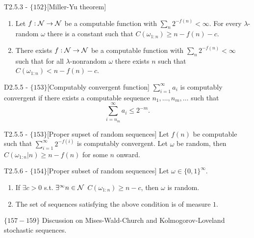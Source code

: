 \documentclass{article}
\begin{document}
\begin{flexitheorem}{T2.5.3 - $\{152\}$}[Miller-Yu theorem]
    \begin{enumerate}[label = (\roman*)]
        \item Let $f : \mathcal{N} \to \mathcal{N}$ be a computable function with $\sum_n 2^{-f(n)} < \infty$. For every $\lambda$-random $\omega$ there is a constant such that $C(\omega_{1:n}) \geq n -f(n) - c$.
        \item There exists $f : \mathcal{N} \to \mathcal{N}$ be a computable function with $\sum_n 2^{-f(n)} < \infty$ such that for all $\lambda$-nonrandom $\omega$ there exists $n$ such that $C(\omega_{1:n}) < n -f(n) - c$.
    \end{enumerate}
\end{flexitheorem}

\begin{flexidefinition}{D2.5.5 - $\{153\}$}[Computably convergent function]
    $\sum_{i=1}^\infty a_i$ is computably convergent if there exists a computable sequence $n_1, \ldots, n_m, \ldots$ such that 
    \begin{equation}
        \sum_{i=n_m}^\infty a_i \leq 2^{-m}.
    \end{equation}
    
\end{flexidefinition}
    
\begin{flexitheorem}{T2.5.5 - $\{153\}$}[Proper supset of random sequences]
    Let $f(n)$ be computable such that $\sum_{i=1}^\infty 2^{-f(i)}$ is computably convergent. Let $\omega$ be random, then $C(\omega_{1:n}|n) \geq n - f(n)$ for some $n$ onward.
    
   
\end{flexitheorem}

\begin{flexitheorem}{T2.5.6 - $\{154\}$}[Proper subset of random sequences]
    Let $\omega \in \{0,1\}^\infty$.
    \begin{enumerate}[label = (\roman*)]
        \item If $\exists c > 0$ s.t. $\exists^\infty n \in \mathcal{N}$ $C(\omega_{1:n}) \geq n - c$, then $\omega$ is random.
        \item The set of sequences satisfying the above condition is of measure $1$.
    \end{enumerate}
\end{flexitheorem}

$\{157 - 159\}$ Discussion on Mises-Wald-Church and Kolmogorov-Loveland stochastic sequences.
\end{document}
